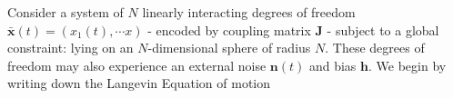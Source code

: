 Consider a system of $N$ linearly interacting degrees of freedom $\mathbf{\bar x}(t) = (x_1(t),\cdots x)$ - encoded by coupling matrix $\mathbf{J}$ - subject to a global constraint: lying on an $N$-dimensional sphere of radius $N$. These degrees of freedom may also experience an external noise $\mathbf{n}(t)$ and bias $\mathbf{h}$. We begin by writing down the Langevin Equation of motion